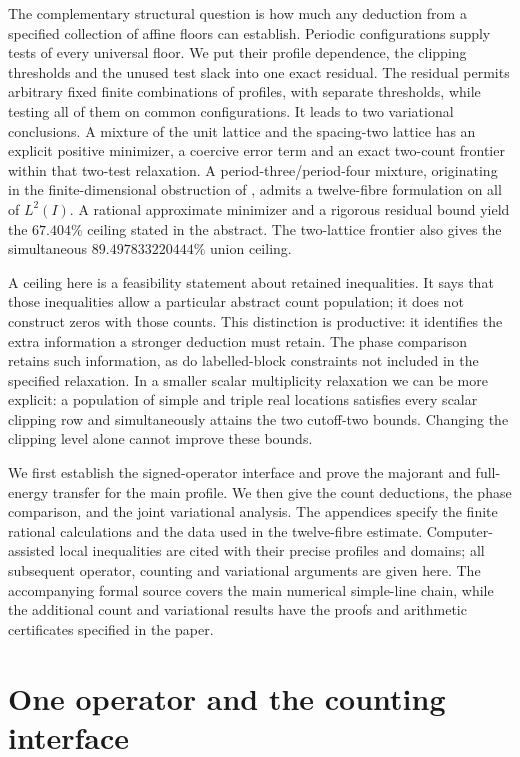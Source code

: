 \documentclass[11pt,reqno]{amsart}
\numberwithin{equation}{section}
\begin{document}
The complementary structural question is how much any deduction from
a specified collection of affine floors can establish. Periodic
configurations supply tests of every universal floor. We put their
profile dependence, the clipping thresholds and the unused test
slack into one exact residual. The residual permits arbitrary fixed
finite combinations of profiles, with separate thresholds, while
testing all of them on common configurations. It leads to two
variational conclusions. A mixture of the unit lattice and the
spacing-two lattice has an explicit positive minimizer, a coercive
error term and an exact two-count frontier within that
two-test relaxation. A period-three/period-four mixture, originating
in the finite-dimensional obstruction of
\cite{GebendorferCap}, admits a twelve-fibre formulation on all of
\(L^2(I)\). A rational approximate minimizer and a rigorous residual
bound yield the \(67.404\%\) ceiling stated in the abstract.
The two-lattice frontier also gives the simultaneous
\(89.497833220444\%\) union ceiling.

A ceiling here is a feasibility statement about retained inequalities.
It says that those inequalities allow a particular abstract count
population; it does not construct zeros with those counts. This
distinction is productive: it identifies the extra information a
stronger deduction must retain. The phase comparison retains such
information, as do labelled-block constraints not included in the
specified relaxation. In a smaller scalar multiplicity relaxation we
can be more explicit: a population of simple and triple real
locations satisfies every scalar clipping row and simultaneously
attains the two cutoff-two bounds. Changing the clipping level alone
cannot improve these bounds.

We first establish the signed-operator interface and prove the
majorant and full-energy transfer for the main profile. We then give
the count deductions, the phase comparison, and the joint
variational analysis. The appendices specify the finite rational
calculations and the data used in the twelve-fibre estimate.
Computer-assisted local inequalities are cited with their precise
profiles and domains; all subsequent operator, counting and
variational arguments are given here. The accompanying formal source
covers the main numerical simple-line chain, while the additional
count and variational results have the proofs and arithmetic
certificates specified in the paper.
\section{One operator and the counting interface}
\label{sec:interface}
\end{document}
